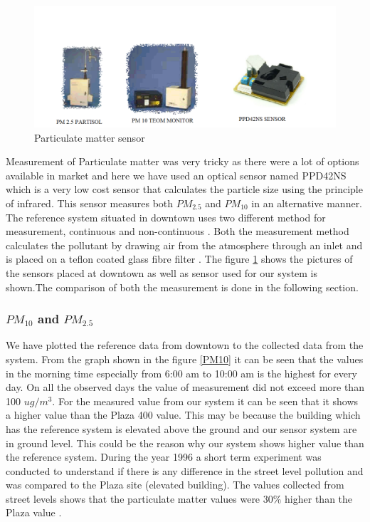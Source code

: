 \begin{figure}[h]
  \begin{center}
  \includegraphics[scale=0.70]{images/figure29.png}
  \end{center}
  \caption{Particulate matter sensor}
\label{PM}
\end{figure}
\bigskip

 Measurement of Particulate matter was very tricky as there were a lot of options available in market and here we have used an optical sensor named PPD42NS which is a very low cost sensor that calculates the particle size using the principle of infrared. This sensor measures both $PM_{2.5}$ and $PM_{10}$ in an alternative manner. The reference system situated in downtown uses two different method for measurement, continuous and non-continuous \cite{EnvironmentalQualitySectionMoE2012}. Both the measurement method calculates the pollutant by drawing air from the atmosphere through an inlet and is placed on a teflon coated glass fibre filter  \cite{Environment2010}. The figure \ref{PM} shows the pictures of the sensors placed at downtown as well as sensor used for our system is shown.The comparison of both the measurement is done in the following section.

 \subsubsection{$PM_{10}$ and $PM_{2.5}$}
We have plotted the reference data from downtown to the collected data from the system. From the graph shown in the figure \ref{PM10} it can be seen that the values in the morning time especially from 6:00 am to 10:00 am is the highest for every day. On all the observed days the value of measurement did not exceed more than 100 $ug/m^3$. For the measured value from our system it can be seen that it shows a higher value than the Plaza 400 value. %
This may be because the building which has the reference system is elevated above the ground and our sensor system are in ground level. This could be the reason why our system shows higher value than the reference system.
 During the year 1996 a short term experiment was conducted to understand if there is any difference in the street level pollution and was compared to the Plaza site (elevated building). The values collected from street levels shows that the particulate matter values were 30$\%$ higher than the Plaza value \cite{Environment2010}. 

